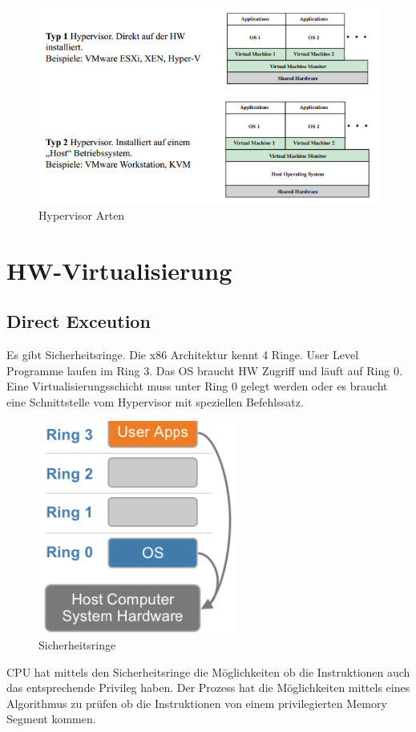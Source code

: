 \begin{figure}[h!]
\centering
\includegraphics[width=0.8\linewidth]{fig/hypervisor-types}
\caption{Hypervisor Arten}
\label{fig:hypervisor-types}
\end{figure}

\section{HW-Virtualisierung}
\subsection{Direct Exceution}
Es gibt Sicherheitsringe. Die x86 Architektur kennt 4 Ringe. User Level Programme laufen im Ring 3. Das OS braucht HW Zugriff und läuft auf Ring 0. Eine Virtualisierungsschicht muss unter Ring 0 gelegt werden oder es braucht eine Schnittstelle vom Hypervisor mit speziellen Befehlssatz. 
\begin{figure}[h!]
\centering
\includegraphics[width=0.4\linewidth]{fig/sicherheitsringe}
\caption{Sicherheitsringe}
\label{fig:sicherheitsringe}
\end{figure}
CPU hat mittels den Sicherheitsringe die Möglichkeiten ob die Instruktionen auch das entsprechende Privileg haben. Der Prozess hat die Möglichkeiten mittels eines Algorithmus zu prüfen ob die Instruktionen von einem privilegierten Memory Segment kommen.

